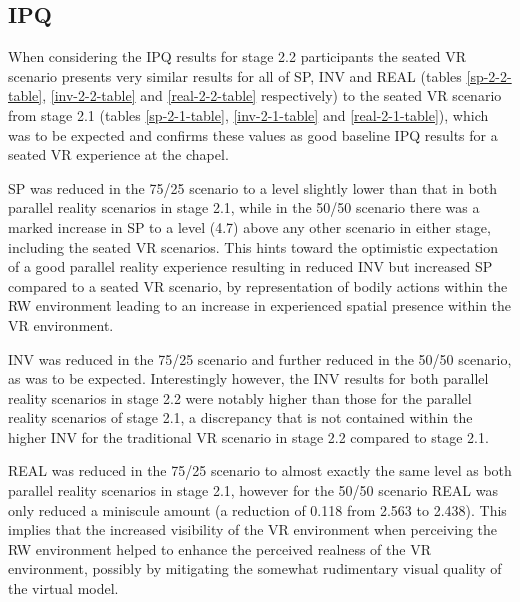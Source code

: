 
\subsection{IPQ}

When considering the IPQ results for stage 2.2 participants the seated VR scenario presents very similar results for all of SP, INV and REAL (tables \ref{sp-2-2-table}, \ref{inv-2-2-table} and \ref{real-2-2-table} respectively) to the seated VR scenario from stage 2.1 (tables \ref{sp-2-1-table}, \ref{inv-2-1-table} and \ref{real-2-1-table}), which was to be expected and confirms these values as good baseline IPQ results for a seated VR experience at the chapel.

SP was reduced in the 75/25 scenario to a level slightly lower than that in both parallel reality scenarios in stage 2.1, while in the 50/50 scenario there was a marked increase in SP to a level (4.7) above any other scenario in either stage, including the seated VR scenarios. This hints toward the optimistic expectation of a good parallel reality experience resulting in reduced INV but increased SP compared to a seated VR scenario, by representation of bodily actions within the RW environment leading to an increase in experienced spatial presence within the VR environment.

INV was reduced in the 75/25 scenario and further reduced in the 50/50 scenario, as was to be expected. Interestingly however, the INV results for both parallel reality scenarios in stage 2.2 were notably higher than those for the parallel reality scenarios of stage 2.1, a discrepancy that is not contained within the higher INV for the traditional VR scenario in stage 2.2 compared to stage 2.1.

REAL was reduced in the 75/25 scenario to almost exactly the same level as both parallel reality scenarios in stage 2.1, however for the 50/50 scenario REAL was only reduced a miniscule amount (a reduction of 0.118 from 2.563 to 2.438). This implies that the increased visibility of the VR environment when perceiving the RW environment helped to enhance the perceived realness of the VR environment, possibly by mitigating the somewhat rudimentary visual quality of the virtual model.

